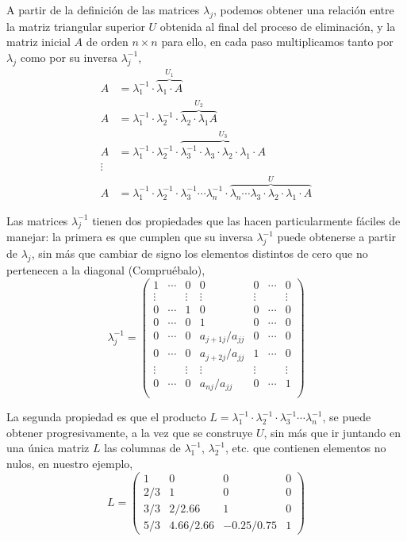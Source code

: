 A partir de la definición de las matrices $\lambda_j$, podemos obtener una relación entre la matriz triangular superior $U$  obtenida al final del proceso de eliminación, y la matriz inicial $A$ de orden $n\times n$ para ello, en cada paso multiplicamos tanto por $\lambda_j$ como por su inversa $\lambda_j^{-1}$,
\begin{align*}
A&=\lambda_1^{-1}\cdot \overbrace{\lambda_1\cdot A}^{U_1}\\
A&=\lambda_1^{-1}\cdot\lambda_2^{-1} \cdot \overbrace{\lambda_2  \cdot \lambda_1 A}^{U_2}\\
A&=\lambda_1^{-1}\cdot \lambda_2^{-1}\cdot \overbrace{ \lambda_3^{-1}\cdot  \lambda_3 \cdot  \lambda_2\cdot \lambda_1 \cdot A}^{U_3}\\
\vdots \\
A&=\lambda_1^{-1} \cdot  \lambda_2^{-1}\cdot  \lambda_3^{-1} \cdots  \lambda_n ^{-1}\cdot \overbrace{\lambda_n \cdots \lambda_3 \cdot \lambda_2\cdot \lambda_1  \cdot A}^{U}
\end{align*}

Las matrices $\lambda_j^{-1}$ tienen dos propiedades que las hacen particularmente fáciles de manejar:  la primera es que cumplen que  su inversa  $\lambda_j^{-1}$ puede obtenerse a partir de $\lambda_j$, sin más que cambiar de signo los elementos distintos de cero que no pertenecen a la diagonal (Compruébalo),
\begin{equation*}
 \lambda_j^{-1}=\begin{pmatrix}
1& \cdots & 0& 0& 0& \cdots & 0\\
 \vdots &  &  \vdots & \vdots &  \vdots & & \vdots\\
0& \cdots & 1& 0& 0& \cdots & 0\\
0& \cdots & 0& 1& 0& \cdots & 0\\
0& \cdots &0 & a_{j+1j}/a_{jj}& 0& \cdots & 0\\
0& \cdots &0 & a_{j+2j}/a_{jj}& 1& \cdots & 0\\
 \vdots &  &  \vdots & \vdots &  \vdots & & \vdots\\
0& \cdots & 0& a_{nj}/a_{jj}& 0&\cdots & 1\\
\end{pmatrix}
\end{equation*}

La segunda propiedad es que el producto $L=\lambda_1^{-1} \cdot  \lambda_2^{-1}\cdot  \lambda_3^{-1} \cdots  \lambda_n ^{-1}$, se puede obtener progresivamente, a la vez que se construye $U$, sin más que ir juntando en una única matriz $L$ las columnas de $\lambda_1^{-1}$, $\lambda_2^{-1}$, etc. que contienen elementos no nulos, en nuestro ejemplo,
\begin{equation*}
 L =\begin{pmatrix}
1& 0& 0&0\\
2/3& 1& 0& 0\\
3/3& 2/2.66& 1& 0\\
5/3& 4.66/2.66& -0.25/0.75 & 1
\end{pmatrix}
\end{equation*}

